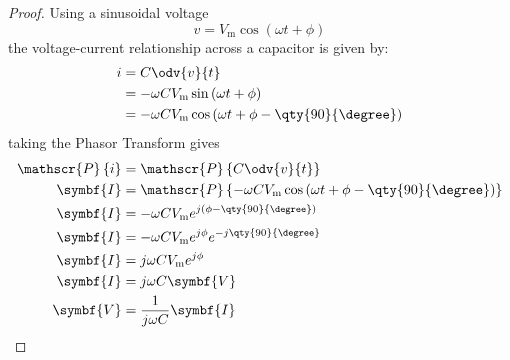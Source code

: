 \documentclass{article}
\begin{document}
\begin{proof}
    Using a sinusoidal voltage
    \begin{equation*}
        v = V_{\mathrm{m}}\cos{\left( \omega t + \phi \right)}
    \end{equation*}
    the voltage-current relationship across a capacitor is given by:
    \begin{align*}
        i & = C \odv{v}{t}                                                                      \\
          & = -\omega C V_{\mathrm{m}} \sin{\left( \omega t + \phi \right)}                     \\
          & = -\omega C V_{\mathrm{m}} \cos{\left( \omega t + \phi - \qty{90}{\degree} \right)}
    \end{align*}
    taking the Phasor Transform gives
    \begin{align*}
        \mathscr{P}\left\{ i \right\} & = \mathscr{P}\left\{ C \odv{v}{t} \right\}                                                                      \\
        \symbf{I}                     & = \mathscr{P}\left\{ -\omega C V_{\mathrm{m}} \cos{\left( \omega t + \phi - \qty{90}{\degree} \right)} \right\} \\
        \symbf{I}                     & = -\omega C V_{\mathrm{m}} e^{j\left( \phi - \qty{90}{\degree} \right)}                                         \\
        \symbf{I}                     & = -\omega C V_{\mathrm{m}} e^{j \phi} e^{-j\qty{90}{\degree}}                                                   \\
        \symbf{I}                     & = j\omega C V_{\mathrm{m}} e^{j \phi}                                                                           \\
        \symbf{I}                     & = j\omega C \symbf{V}                                                                                           \\
        \symbf{V}                     & = \frac{1}{j\omega C} \symbf{I}
    \end{align*}
\end{proof}
\end{document}
